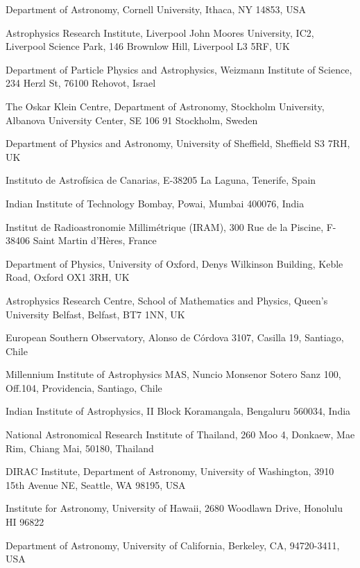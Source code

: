 \documentclass{nature_plusfigure}
\begin{document}
\begin{small}
\begin{affiliations}
\label{sec:affiliations}

\item Department of Astronomy, Cornell University, Ithaca, NY 14853, USA
\item Astrophysics Research Institute, Liverpool John Moores University, IC2, Liverpool Science Park, 146 Brownlow Hill, Liverpool L3 5RF, UK
\item Department of Particle Physics and Astrophysics, Weizmann Institute of Science, 234 Herzl St, 76100 Rehovot, Israel
\item The Oskar Klein Centre, Department of Astronomy, Stockholm University, Albanova University Center, SE 106 91 Stockholm, Sweden
\item Department of Physics and Astronomy, University of Sheffield, Sheffield S3 7RH, UK
\item Instituto de Astrofísica de Canarias, E-38205 La
Laguna, Tenerife, Spain
\item Indian Institute of Technology Bombay, Powai, Mumbai 400076, India
\item Institut de Radioastronomie Millimétrique (IRAM), 300 Rue de la Piscine, F-38406 Saint Martin d’Hères, France
\item Department of Physics, University of Oxford, Denys Wilkinson Building, Keble Road, Oxford OX1 3RH, UK
\item Astrophysics Research Centre, School of Mathematics and Physics, Queen’s University Belfast, Belfast, BT7 1NN, UK
\item European Southern Observatory, Alonso de C\'ordova 3107, Casilla 19, Santiago, Chile
\item Millennium Institute of Astrophysics MAS, Nuncio Monsenor Sotero Sanz 100, Off.104, Providencia, Santiago, Chile
\item Indian Institute of Astrophysics, II Block Koramangala, Bengaluru 560034, India
\item National Astronomical Research Institute of Thailand, 260 Moo 4, Donkaew, Mae Rim, Chiang Mai, 50180, Thailand
\item DIRAC Institute, Department of Astronomy, University of Washington, 3910 15th Avenue NE, Seattle, WA 98195, USA
\item Institute for Astronomy, University of Hawaii, 2680 Woodlawn Drive, Honolulu HI 96822
\item Department of Astronomy, University of California, Berkeley, CA, 94720-3411, USA 

\end{affiliations}
\end{small}
\end{document}
